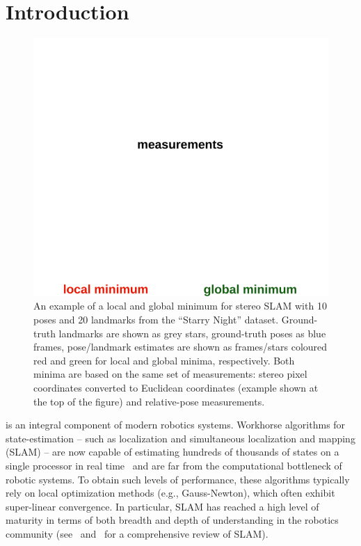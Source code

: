 \documentclass[lettersize,journal]{IEEEtran}
\newcommand{\rev}[1]{\color{red}{#1}\color{black}}
\begin{document}
\begin{IEEEkeywords}
	\rev{Localization, SLAM, Anisotropic, Certifiable, Optimization.}
\end{IEEEkeywords}

\section{Introduction}
\begin{figure}[!t]
	\centering
	\vspace*{-0.05in}
	\includegraphics[width=\columnwidth]{figs/slam_local_min}
	\vspace*{-0.3in}
	\caption{An example of a local and global minimum for stereo SLAM with 10 poses and 20 landmarks from the ``Starry Night'' dataset. Ground-truth landmarks are shown as grey stars, ground-truth poses as blue frames, pose/landmark estimates are shown as frames/stars coloured red and green for local and global minima, respectively. 
	Both minima are based on the same set of measurements: stereo pixel coordinates converted to Euclidean coordinates (example shown at the top of the figure) and relative-pose measurements.
	}
	\vspace*{-0.22in}
	\label{fig:slam_local_min}
\end{figure}

 is an integral component of modern robotics systems. Workhorse algorithms for state-estimation -- such as localization and simultaneous localization and mapping (SLAM) -- are now capable of estimating hundreds of thousands of states on a single processor in real time~\cite{rosenAdvancesInferenceRepresentation2021} and are far from the computational bottleneck of robotic systems. To obtain such levels of performance, these algorithms typically rely on local optimization methods (e.g., Gauss-Newton), which often exhibit super-linear convergence. In particular, SLAM has reached a high level of maturity in terms of both breadth and depth of understanding in the robotics community (see~\cite{baileySimultaneousLocalizationMapping2006} and~\cite{durrant-whyteSimultaneousLocalizationMapping2006} for a comprehensive review of SLAM).  
\end{document}
